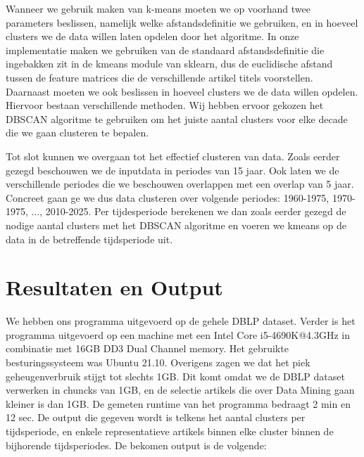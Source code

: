 \documentclass[11pt]{article}
\begin{document}
Wanneer we gebruik maken van k-means moeten we op voorhand twee parameters beslissen, namelijk welke afstandsdefinitie we gebruiken, en in hoeveel clusters we de data willen laten opdelen door het algoritme. In onze implementatie maken we gebruiken van de standaard afstandsdefinitie die ingebakken zit in de kmeans module van sklearn, dus de euclidische afstand tussen de feature matrices die de verschillende artikel titels voorstellen. Daarnaast moeten we ook beslissen in hoeveel clusters we de data willen opdelen. Hiervoor bestaan verschillende methoden. Wij hebben ervoor gekozen het DBSCAN algoritme te gebruiken om het juiste aantal clusters voor elke decade die we gaan clusteren te bepalen. 

Tot slot kunnen we overgaan tot het effectief clusteren van data. Zoals eerder gezegd beschouwen we de inputdata in periodes van 15 jaar. Ook laten we de verschillende periodes die we beschouwen overlappen met een overlap van 5 jaar. Concreet gaan ge we dus data clusteren over volgende periodes: 1960-1975, 1970-1975, ..., 2010-2025. Per tijdesperiode berekenen we dan zoals eerder gezegd de nodige aantal clusters met het DBSCAN algoritme en voeren we kmeans op de data in de betreffende tijdsperiode uit. 

\section{Resultaten en Output}

We hebben ons programma uitgevoerd op de gehele DBLP dataset. Verder is het programma uitgevoerd op een machine met een Intel Core i5-4690K@4.3GHz in combinatie met 16GB DD3 Dual Channel memory. Het gebruikte besturingssysteem was Ubuntu 21.10. Overigens zagen we dat het piek geheugenverbruik stijgt tot slechts 1GB. Dit komt omdat we de DBLP dataset verwerken in chuncks van 1GB, en de selectie artikels die over Data Mining gaan kleiner is dan 1GB. De gemeten runtime van het programma bedraagt 2 min en 12 sec. De output die gegeven wordt is telkens het aantal clusters per tijdsperiode, en enkele representatieve artikels binnen elke cluster binnen de bijhorende tijdsperiodes. De bekomen output is de volgende:
\end{document}
